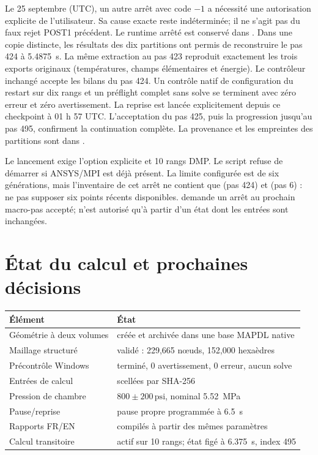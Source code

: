 \documentclass[oneside,openany]{amsdtx}
\begin{document}
Le 25 septembre (UTC), un autre arrêt avec code \(-1\) a nécessité une
autorisation explicite de l'utilisateur. Sa cause exacte reste indéterminée;
il ne s'agit pas du faux rejet POST1 précédent. Le runtime arrêté est conservé
dans . Dans une copie distincte,
les résultats des dix partitions ont permis de reconstruire le pas 424 à
\SI{5.4875}{s}. La même extraction au pas 423 reproduit exactement les trois
exports originaux (températures, champs élémentaires et énergie).
Le contrôleur inchangé accepte les bilans du pas 424. Un contrôle natif de
configuration du restart sur dix rangs et un préflight complet sans solve
se terminent avec zéro erreur et zéro avertissement. La reprise est lancée
explicitement depuis ce checkpoint à 01 h 57 UTC. L'acceptation du pas 425,
puis la progression jusqu'au pas 495, confirment la continuation complète.
La provenance et les empreintes des partitions sont
dans .

Le lancement exige l'option explicite  et 10 rangs DMP. Le script
refuse de démarrer si ANSYS/MPI est déjà présent. La limite configurée est de
six générations, mais l'inventaire de cet arrêt ne contient que 
(pas 424) et  (pas 6) : ne pas supposer six points récents disponibles.
 demande un arrêt au prochain
macro-pas accepté;  n'est autorisé qu'à partir d'un état
 dont les entrées sont inchangées.

\section{État du calcul et prochaines décisions}
\begin{table}[H]\centering
\begin{tabular}{L{7.2cm}L{5.4cm}}\toprule
Élément & État\\\midrule
Géométrie à deux volumes & créée et archivée dans une base MAPDL native\\
Maillage structuré & validé : 229,665 nœuds, 152,000 hexaèdres\\
Précontrôle Windows & terminé, 0 avertissement, 0 erreur, aucun solve\\
Entrées de calcul & scellées par SHA-256\\
Pression de chambre & \(800\pm200\,\mathrm{psi}\), nominal \SI{5.52}{MPa}\\
Pause/reprise & pause propre programmée à \SI{6.5}{s}\\
Rapports FR/EN & compilés à partir des mêmes paramètres\\
Calcul transitoire & actif sur 10 rangs; état figé à \SI{6.375}{s}, index 495\\\bottomrule
\end{tabular}
\end{table}
\end{document}
